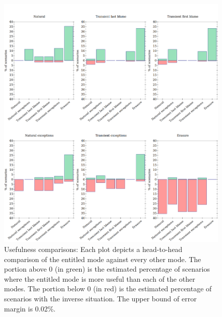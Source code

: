 \begin{figure}
  \centering
  \includegraphics[width=\textwidth]{./plots/avo-bars}
  \caption{Usefulness comparisons: Each plot depicts a head-to-head comparison of the entitled mode against every other mode.
  The portion above 0 (in green) is the estimated percentage of scenarios where the entitled mode is more useful than each of the other modes.
  The portion below 0 (in red) is the estimated percentage of scenarios with the inverse situation.
  The upper bound of error margin is 0.02\%.}
  \label{fig:avo-bars}
\end{figure}

